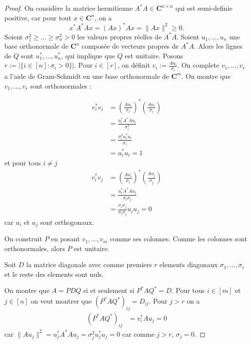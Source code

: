 \begin{proof}
On considère la matrice hermitienne $A^{*}A\in \mathbf{C}^{n\times n}$ qui est semi-definie positive, car pour tout $x \in \mathbf{C}^{n}$, on a 
$$
x^{*}A^{*}Ax=(Ax)^{*}Ax=\lVert Ax \rVert ^{2}\ge 0.
$$
Soient $\sigma_{1}^{2}\ge\dots\ge\sigma _{n}^{2}>0$ les valeurs propres réelles de $A^{*}A$. Soient $u_{1},\dots ,u_{n}$ une base orthonormale de $\mathbf{C}^{n}$ composée de vecteurs propres de $A^{*}A$. Alors les lignes de $Q$ sont $u_{1}^{*},\dots,u_{n}^{*}$, qui implique que $Q$ est unitaire. Posons $r :=|\{ i\in[n]:\sigma _{i}>0\}|$. Pour $i\in[r]$, on définit $v_{i}:=\frac{Au_{i}}{\sigma _{i}}$. On complete $v_{1},\dots,v_{r}$ a l'aide de Gram-Schmidt en une base orthonormale de $\mathbf{C}^{m}$. On montre que $v_{1},\dots,v_{r}$ sont orthonormales :

\begin{align*}
v_{i}^{*}v_{i} & =\left( \frac{Au_{i}}{\sigma _{i}} \right)^{*}\left( \frac{Au_{i}}{\sigma _{i}} \right) \\
 & =\frac{u_{i}^{*}A^{*}Au_{i}}{\sigma _{i}^{2}} \\
 & =\frac{\sigma _{i}^{2}u_{i}^{*}u_{i}}{\sigma _{i}} \\
 & =u_{i}^{*}u_{i}=1
\end{align*}
et pour tous $i\neq j$
\begin{align*}
v_{i}^{*}v_{j} & =\left( \frac{Au_{i}}{\sigma _{i}} \right)^{*}\left( \frac{Au_{j}}{\sigma _{j}} \right) \\
 & =\frac{u_{i}^{*}A^{*}Au_{j}}{\sigma _{i}\sigma _{j}} \\
 & =\frac{\sigma _{i}\sigma _{j}}{\sigma _{i}\sigma _{j}}u_{i}u_{j}=0
\end{align*}
car $u_{i}$ et $u_{j}$ sont orthogonaux.

On construit $P$ en posant $v_{1},\dots,v_{m}$ comme ses colonnes. Comme les colonnes sont orthonormales, alors $P$ est unitaire.

Soit $D$ la matrice diagonale avec comme premiers $r$ elements diagonaux $\sigma _{1},\dots,\sigma _{r}$ et le reste des elements sont nuls.

On montre que $A=PDQ$ si et seulement si $P^{*}AQ^{*}=D$. Pour tous $i\in [m]$ et $j\in[n]$ on veut montrer que $(P^{*}AQ^{*})_{ij}=D_{ij}$. Pour $j>r$ on a 
\begin{align*}
(P^{*}AQ^{*})_{ij} & =v_{i}^{*}Au_{j}=0
\end{align*}
car $\lVert Au_{j} \rVert^{2}=u_{j}^{*}A^{*}Au_{j}=\sigma _{j}^{2}u_{j}^{*}u_{j}=0$ car comme $j>r$, $\sigma _{j}=0$.


\end{proof}
